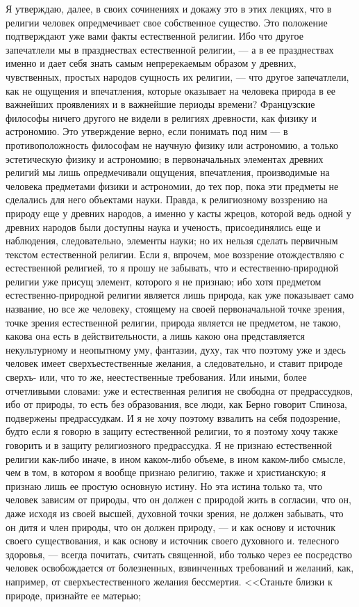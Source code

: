 \documentclass[12pt]{article}
\begin{document}
Я утверждаю, далее, в своих сочинениях и докажу это в этих лекциях, что в религии человек опредмечивает свое собственное существо. Это положение подтверждают уже вами факты естественной религии. Ибо что другое запечатлели мы в празднествах естественной религии, --- а в ее празднествах именно и дает себя знать самым непререкаемым образом у древних, чувственных, простых народов сущность их религии, --- что другое запечатлели, как не ощущения и впечатления, которые оказывает на человека природа в ее важнейших проявлениях и в важнейшие периоды времени? Французские философы ничего другого не видели в религиях древности, как физику и астрономию. Это утверждение верно, если понимать под ним --- в противоположность философам не научную физику или астрономию, а только эстетическую физику и астрономию; в первоначальных элементах древних религий мы лишь опредмечивали ощущения, впечатления, производимые на человека предметами физики и астрономии, до тех пор, пока эти предметы не сделались для него объектами науки. Правда, к религиозному воззрению на природу еще у древних народов, а именно у касты жрецов, которой ведь одной у древних народов были доступны наука и ученость, присоединялись еще и наблюдения, следовательно, элементы науки; но их нельзя сделать первичным текстом естественной религии. Если я, впрочем, мое воззрение отождествляю с естественной религией, то я прошу не забывать, что и естественно-природной религии уже присущ элемент, которого я не признаю; ибо хотя предметом естественно-природной религии является лишь природа, как уже показывает само название, но все же человеку, стоящему на своей первоначальной точке зрения, точке зрения естественной религии, природа является не предметом, не такою, какова она есть в действительности, а лишь какою она представляется некультурному и неопытному уму, фантазии, духу, так что поэтому уже и здесь человек имеет сверхъестественные желания, а следовательно, и ставит природе сверхъ- или, что то же, неестественные требования. Или иными, более отчетливыми словами: уже и естественная религия не свободна от предрассудков, ибо от природы, то есть без образования, все люди, как Берно говорит Спиноза, подвержены предрассудкам. И я не хочу поэтому взвалить на себя подозрение, будто если я говорю в защиту естественной религии, то я поэтому хочу также говорить и в защиту религиозного предрассудка. Я не признаю естественной религии как-либо иначе, в ином каком-либо объеме, в ином каком-либо смысле, чем в том, в котором я вообще признаю религию, также и христианскую; я признаю лишь ее простую основную истину. Но эта истина только та, что человек зависим от природы, что он должен с природой жить в согласии, что он, даже исходя из своей высшей, духовной точки зрения, не должен забывать, что он дитя и член природы, что он должен природу, --- и как основу и источник своего существования, и как основу и источник своего духовного и. телесного здоровья, --- всегда почитать, считать священной, ибо только через ее посредство человек освобождается от болезненных, взвинченных требований и желаний, как, например, от сверхъестественного желания бессмертия. <<Станьте близки к природе, признайте ее матерью;
\end{document}

